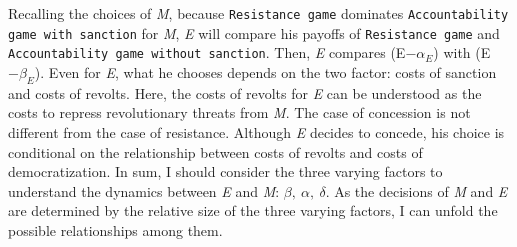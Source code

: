 \documentclass[11pt]{article}
\begin{document}
Recalling the choices of \textit{M}, because \texttt{Resistance game} dominates \texttt{Accountability game with sanction} for \textit{M}, \textit{E} will compare his payoffs of \texttt{Resistance game} and \texttt{Accountability game without sanction}. Then, \textit{E} compares (E$-\alpha_{E}$) with (E$-\beta_{E}$). Even for \textit{E}, what he chooses depends on the two factor: costs of sanction and costs of revolts. Here, the costs of revolts for \textit{E} can be understood as the costs to repress revolutionary threats from \textit{M}. The case of concession is not different from the case of resistance. Although \textit{E} decides to concede, his choice is conditional on the relationship between costs of revolts and costs of democratization. In sum, I should consider the three varying factors to understand the dynamics between \textit{E} and \textit{M}: $\beta, \: \alpha, \: \delta$. As the decisions of \textit{M} and \textit{E} are determined by the relative size of the three varying factors, I can unfold the possible relationships among them.
\end{document}
